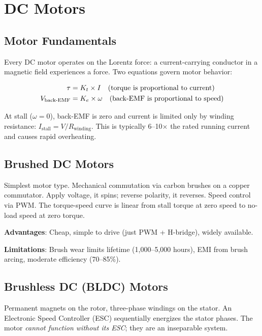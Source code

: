 \documentclass[11pt,letterpaper,twoside,openany]{book}
\begin{document}
\section{DC Motors}

\subsection{Motor Fundamentals}

Every DC motor operates on the Lorentz force: a current-carrying conductor in a magnetic field experiences a force. Two equations govern motor behavior:

\begin{align}
  \tau &= K_t \times I \quad \text{(torque is proportional to current)} \\
  V_{\text{back-EMF\index{back-EMF}}} &= K_e \times \omega \quad \text{(back-EMF is proportional to speed)}
\end{align}

At stall ($\omega = 0$), back-EMF is zero and current is limited only by winding resistance: $I_{\text{stall}} = V / R_{\text{winding}}$. This is typically 6--10$\times$ the rated running current and causes rapid overheating.

\subsection{Brushed DC Motors}

Simplest motor type. Mechanical commutation via carbon brushes on a copper commutator. Apply voltage, it spins; reverse polarity, it reverses. Speed control via PWM. The torque-speed curve is linear from stall torque at zero speed to no-load speed at zero torque.

\textbf{Advantages}: Cheap, simple to drive (just PWM + H-bridge), widely available.

\textbf{Limitations}: Brush wear limits lifetime (1,000--5,000 hours), EMI from brush arcing, moderate efficiency (70--85\%).

\subsection{Brushless DC (BLDC) Motors}

Permanent magnets on the rotor, three-phase windings on the stator. An Electronic Speed Controller (ESC) sequentially energizes the stator phases. The motor \emph{cannot function without its ESC}; they are an inseparable system.
\end{document}
